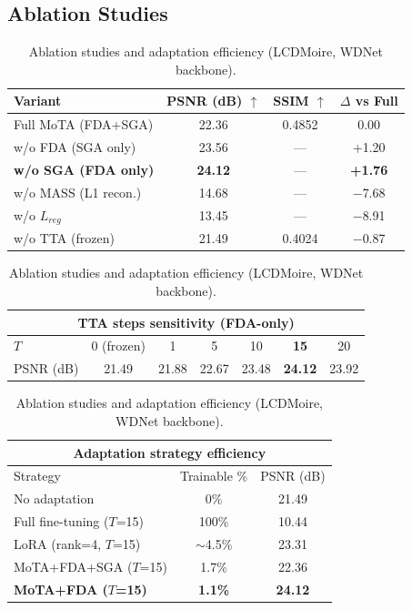 \documentclass[10pt,twocolumn,letterpaper]{article}
\begin{document}
\subsection{Ablation Studies}
\label{sec:ablation}

\begin{table}[tbp]
\centering
\footnotesize
\caption{Ablation studies and adaptation efficiency (LCDMoire, WDNet backbone).}
\label{tab:ablation}
\setlength{\tabcolsep}{3.5pt}
\begin{tabular}{@{}lccc@{}}
\toprule
Variant & PSNR (dB) $\uparrow$ & SSIM $\uparrow$ & $\Delta$ vs Full \\
\midrule
Full MoTA (FDA+SGA) & 22.36 & 0.4852 & 0.00 \\
w/o FDA (SGA only) & 23.56 & --- & +1.20 \\
\textbf{w/o SGA (FDA only)} & \textbf{24.12} & --- & \textbf{+1.76} \\
w/o MASS (L1 recon.) & 14.68 & --- & $-$7.68 \\
w/o $L_{reg}$ & 13.45 & --- & $-$8.91 \\
w/o TTA (frozen) & 21.49 & 0.4024 & $-$0.87 \\
\bottomrule
\end{tabular}

\vspace{0.8em}

\begin{tabular}{@{}lcccccc@{}}
\toprule
\multicolumn{7}{c}{TTA steps sensitivity (FDA-only)} \\
\midrule
$T$ & 0 (frozen) & 1 & 5 & 10 & \textbf{15} & 20 \\
\midrule
PSNR (dB) & 21.49 & 21.88 & 22.67 & 23.48 & \textbf{24.12} & 23.92 \\
\bottomrule
\end{tabular}

\vspace{0.8em}

\begin{tabular}{@{}lcc@{}}
\toprule
\multicolumn{3}{c}{Adaptation strategy efficiency} \\
\midrule
Strategy & Trainable \% & PSNR (dB) \\
\midrule
No adaptation & 0\% & 21.49 \\
Full fine-tuning ($T$=15) & 100\% & 10.44 \\
LoRA (rank=4, $T$=15) & $\sim$4.5\% & 23.31 \\
MoTA+FDA+SGA ($T$=15) & 1.7\% & 22.36 \\
\textbf{MoTA+FDA ($T$=15)} & \textbf{1.1\%} & \textbf{24.12} \\
\bottomrule
\end{tabular}
\end{table}
\end{document}
